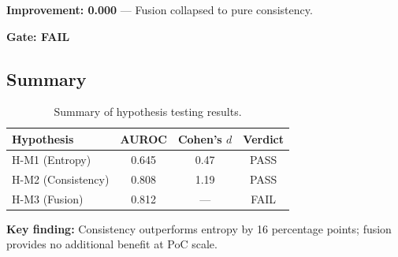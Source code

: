 \textbf{Improvement: 0.000} --- Fusion collapsed to pure consistency.

\textbf{Gate: FAIL}

\subsection{Summary}

\begin{table}[h]
\centering
\begin{tabular}{lccc}
\toprule
Hypothesis & AUROC & Cohen's $d$ & Verdict \\
\midrule
H-M1 (Entropy) & 0.645 & 0.47 & PASS \\
H-M2 (Consistency) & 0.808 & 1.19 & PASS \\
H-M3 (Fusion) & 0.812 & --- & FAIL \\
\bottomrule
\end{tabular}
\caption{Summary of hypothesis testing results.}
\label{tab:summary}
\end{table}

\textbf{Key finding:} Consistency outperforms entropy by 16 percentage points; fusion provides no additional benefit at PoC scale.
